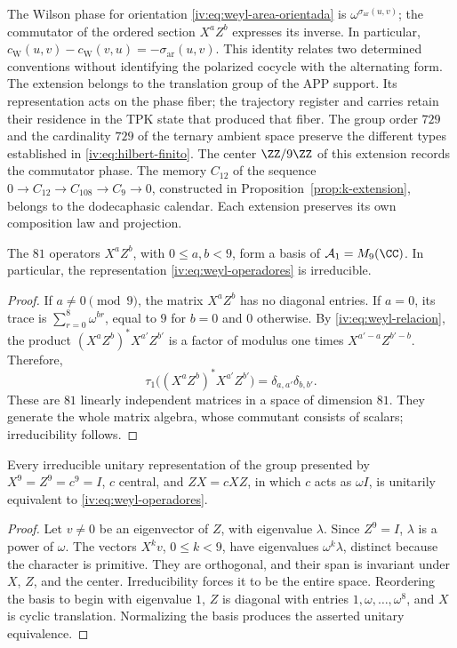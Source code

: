 The Wilson phase for orientation
\eqref{iv:eq:weyl-area-orientada} is
\(\omega^{\sigma_{\mathrm{ar}}(u,v)}\); the commutator of the
ordered section \(X^aZ^b\) expresses its inverse. In particular,
\(c_{\mathrm W}(u,v)-c_{\mathrm W}(v,u)
=-\sigma_{\mathrm{ar}}(u,v)\).
This identity relates two determined conventions without identifying
the polarized cocycle with the alternating form. The extension belongs
to the translation group of the APP support. Its representation acts on
the phase fiber; the trajectory register and carries retain
their residence in the TPK state that produced that fiber. The group order \(729\)
and the cardinality \(729\) of the ternary ambient space preserve the
different types established in \eqref{iv:eq:hilbert-finito}.
The center \(\ZZ/9\ZZ\) of this extension records the commutator
phase. The memory \(C_{12}\) of the sequence
\(0\to C_{12}\to C_{108}\to C_9\to0\), constructed in
Proposition~\ref{prop:k-extension}, belongs to the dodecaphasic
calendar. Each extension preserves its own composition law and
projection.

\begin{proposition}
\label{iv:prop:weyl-completo}
The \(81\) operators \(X^aZ^b\), with \(0\leq a,b<9\), form
a basis of \(\mathcal A_1=M_9(\CC)\). In particular, the
representation \eqref{iv:eq:weyl-operadores} is irreducible.
\end{proposition}
\begin{proof}
If \(a\neq0\pmod9\), the matrix \(X^aZ^b\) has no diagonal
entries. If \(a=0\), its trace is
\(\sum_{r=0}^8\omega^{br}\), equal to \(9\) for \(b=0\) and
\(0\) otherwise. By \eqref{iv:eq:weyl-relacion}, the
product \((X^aZ^b)^*X^{a'}Z^{b'}\) is a factor of modulus one
times \(X^{a'-a}Z^{b'-b}\). Therefore,
\[
 \tau_1\bigl((X^aZ^b)^*X^{a'}Z^{b'}\bigr)
 =\delta_{a,a'}\delta_{b,b'}.
\]
These are \(81\) linearly independent matrices in a space of
dimension \(81\). They generate the whole matrix algebra, whose commutant
consists of scalars; irreducibility follows.
\end{proof}

\begin{theorem}
\label{iv:thm:weyl-unicidad}
Every irreducible unitary representation of the group presented by
\(X^9=Z^9=c^9=I\), \(c\) central, and \(ZX=cXZ\), in which
\(c\) acts as \(\omega I\), is unitarily equivalent to
\eqref{iv:eq:weyl-operadores}.
\end{theorem}
\begin{proof}
Let \(v\neq0\) be an eigenvector of \(Z\), with eigenvalue \(\lambda\).
Since \(Z^9=I\), \(\lambda\) is a power of \(\omega\).
The vectors \(X^kv\), \(0\leq k<9\), have eigenvalues
\(\omega^k\lambda\), distinct because the character is primitive.
They are orthogonal, and their span is invariant under \(X\),
\(Z\), and the center. Irreducibility forces it to be the entire
space. Reordering the basis to begin with eigenvalue \(1\),
\(Z\) is diagonal with entries \(1,\omega,\ldots,\omega^8\),
and \(X\) is cyclic translation. Normalizing the basis
produces the asserted unitary equivalence.
\end{proof}

